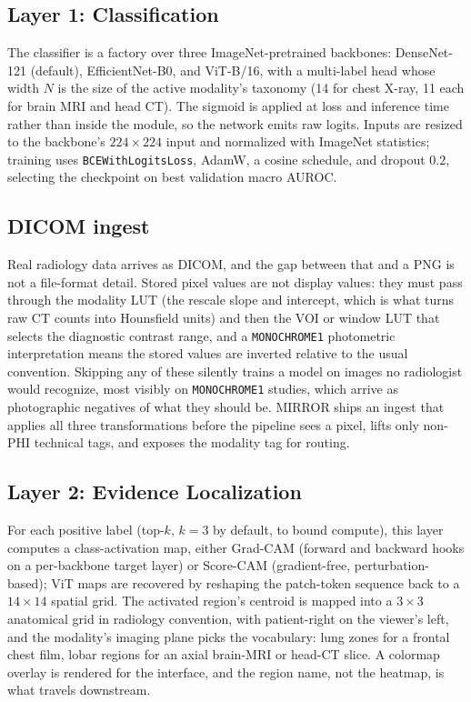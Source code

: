 \documentclass[10pt,twocolumn]{article}
\newcommand{\code}[1]{\texttt{\small #1}}
\begin{document}
\subsection{Layer 1: Classification}
The classifier is a factory over three ImageNet-pretrained backbones: DenseNet-121
(default), EfficientNet-B0, and ViT-B/16, with a multi-label head whose width $N$
is the size of the active modality's taxonomy (14 for chest X-ray, 11 each for
brain MRI and head CT). The sigmoid is applied at loss and inference time rather
than inside the module, so the network emits raw logits. Inputs are resized to the
backbone's $224\times224$ input and normalized with ImageNet statistics; training uses
\code{BCEWithLogitsLoss}, AdamW, a cosine schedule, and dropout $0.2$, selecting
the checkpoint on best validation macro AUROC.

\subsection{DICOM ingest}
Real radiology data arrives as DICOM, and the gap
between that and a PNG is not a file-format detail. Stored pixel values are not
display values: they must pass through the modality LUT (the rescale slope and
intercept, which is what turns raw CT counts into Hounsfield units) and then the
VOI or window LUT that selects the diagnostic contrast range, and a
\code{MONOCHROME1} photometric interpretation means the stored values are inverted
relative to the usual convention. Skipping any of these silently trains a model on
images no radiologist would recognize, most visibly on \code{MONOCHROME1} studies,
which arrive as photographic negatives of what they should be. MIRROR ships an
ingest that applies all three transformations before the pipeline sees a pixel,
lifts only non-PHI technical tags, and exposes the modality tag for routing.

\subsection{Layer 2: Evidence Localization}
For each positive label (top-$k$, $k{=}3$ by default, to bound compute), this layer
computes a class-activation map, either Grad-CAM (forward and backward hooks on a
per-backbone target layer) or Score-CAM (gradient-free, perturbation-based); ViT
maps are recovered by reshaping the patch-token sequence back to a $14\times14$
spatial grid. The activated region's centroid is mapped into a $3\times3$
anatomical grid in radiology convention, with patient-right on the viewer's left,
and the modality's imaging plane picks the vocabulary: lung zones for a frontal
chest film, lobar regions for an axial brain-MRI or head-CT slice. A colormap
overlay is rendered for the interface, and the region name, not the heatmap, is
what travels downstream.
\end{document}
